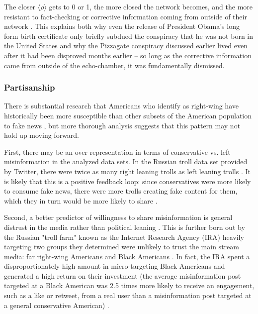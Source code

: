 \documentclass[12pt]{article}
\begin{document}
The closer $\langle \rho \rangle$ gets to 0 or 1, the more closed the network becomes, and the more resistant to fact-checking or corrective information coming from outside of their network \cite{garrett2013undermining,lord1979biased,edwards1996disconfirmation,redlawsk2002hot, taber2006motivated}. This explains both why even the release of President Obama's long form birth certificate only briefly subdued the conspiracy that he was not born in the United States \cite{nyhan2012new} and why the Pizzagate conspiracy discussed earlier lived even after it had been disproved months earlier -- so long as the corrective information came from outside of the echo-chamber, it was fundamentally dismissed.


\subsubsection{Partisanship} 
There is substantial research that Americans who identify as right-wing have historically been more susceptible than other subsets of the American population to fake news \cite{guess2019less,benkler2018network,grinberg2019fake,allcott2017social,badawy2018analyzing}, but more thorough analysis suggests that this pattern may not hold up moving forward.

First, there may be an over representation in terms of conservative vs. left misinformation in the analyzed data sets. In the Russian troll data set provided by Twitter, there were twice as many right leaning trolls as left leaning trolls \cite{freelon2020black,badawy2018analyzing,benkler2018network}. It is likely that this is a positive feedback loop: since conservatives were more likely to consume fake news, there were more trolls creating fake content for them, which they in turn would be more likely to share \cite{bakir2018fake,bodo2019interested,silverman2016analysis,pariser2011filter}. 


Second, a better predictor of willingness to share misinformation is general distrust in the media rather than political leaning \cite{hopp2020people,shin2017partisan,kahan2012ideology,lewandowsky2016motivated,swire2017processing,mourao2019fake}. This is further born out by the Russian "troll farm" known as the Internet Research Agency (IRA) heavily targeting two groups they determined were unlikely to trust the main stream media: far right-wing Americans and Black Americans \cite{diresta2019tactics,howard2019ira,boatwright2018troll,jamieson2020cyberwar,mueller2019mueller,freelon2020black}. In fact, the IRA spent a disproportionately high amount in micro-targeting Black Americans and generated a high return on their investment (the average misinformation post targeted at a Black American was 2.5 times more likely to receive an engagement, such as a like or retweet, from a real user than a misinformation post targeted at a general conservative American) \cite{howard2019ira,freelon2020black}.
\end{document}
